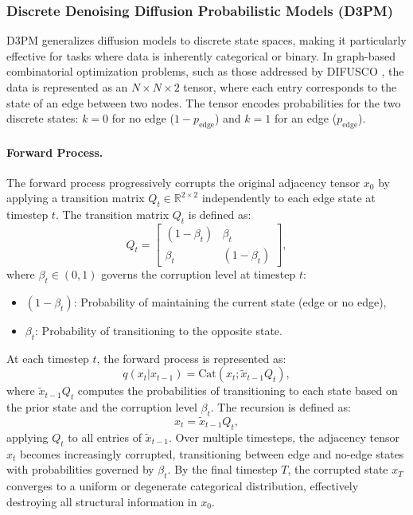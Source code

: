 \subsubsection{Discrete Denoising Diffusion Probabilistic Models (D3PM)}

D3PM \cite{austin2021structured} generalizes diffusion models to discrete state spaces, making it particularly effective for tasks where data is inherently categorical or binary. In graph-based combinatorial optimization problems, such as those addressed by DIFUSCO \cite{sun2023difusco}, the data is represented as an $N \times N \times 2$ tensor, where each entry corresponds to the state of an edge between two nodes. The tensor encodes probabilities for the two discrete states: \(k = 0\) for no edge (\(1 - p_{\text{edge}}\)) and \(k = 1\) for an edge (\(p_{\text{edge}}\)).

\paragraph{Forward Process.}  
The forward process progressively corrupts the original adjacency tensor \(x_0\) by applying a transition matrix \(Q_t \in \mathbb{R}^{2 \times 2}\) independently to each edge state at timestep \(t\). The transition matrix \(Q_t\) is defined as:
\[
Q_t = \begin{bmatrix} 
(1 - \beta_t) & \beta_t \\ 
\beta_t & (1 - \beta_t)
\end{bmatrix},
\]
where \(\beta_t \in (0, 1)\) governs the corruption level at timestep \(t\):
\begin{itemize}
    \item \((1 - \beta_t)\): Probability of maintaining the current state (edge or no edge),
    \item \(\beta_t\): Probability of transitioning to the opposite state.
\end{itemize}

At each timestep \(t\), the forward process is represented as:
\[
q(x_t | x_{t-1}) = \mathrm{Cat}(x_t; \tilde{x}_{t-1} Q_t),
\]
where \(\tilde{x}_{t-1} Q_t\) computes the probabilities of transitioning to each state based on the prior state and the corruption level \(\beta_t\). The recursion is defined as:
\[
x_t = \tilde{x}_{t-1} Q_t,
\]
applying \(Q_t\) to all entries of \(\tilde{x}_{t-1}\). Over multiple timesteps, the adjacency tensor \(x_t\) becomes increasingly corrupted, transitioning between edge and no-edge states with probabilities governed by \(\beta_t\). By the final timestep \(T\), the corrupted state \(x_T\) converges to a uniform or degenerate categorical distribution, effectively destroying all structural information in \(x_0\).


